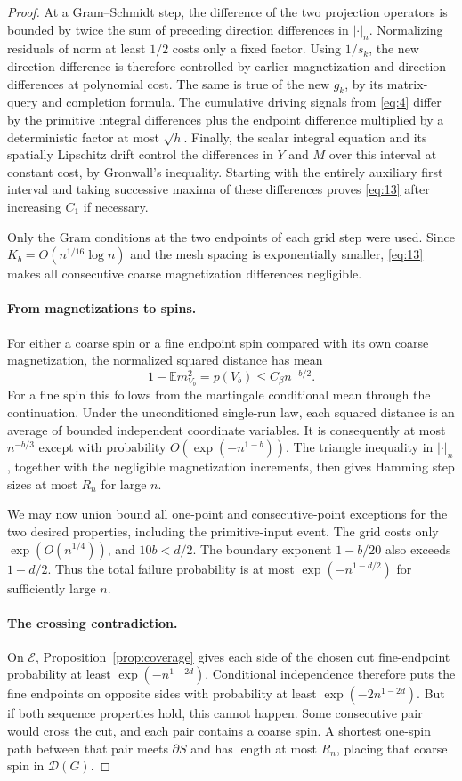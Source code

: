 \begin{proof}
At a Gram--Schmidt step, the difference of the two projection
operators is bounded by twice the sum of preceding direction
differences in $|\cdot|_n$. Normalizing residuals of norm at least
$1/2$ costs only a fixed factor. Using $1/s_k$, the new direction
difference is therefore controlled by earlier magnetization and
direction differences at polynomial cost. The same is true of the
new $g_k$, by its matrix-query and completion formula. The cumulative
driving signals from \eqref{eq:4} differ by the primitive integral
differences plus the endpoint difference multiplied by a deterministic
factor at most $\sqrt h$. Finally, the scalar integral equation
and its spatially Lipschitz drift control the differences in $Y$ and
$M$ over this interval at constant cost, by Gronwall's inequality.
Starting with the entirely auxiliary first interval and taking
successive maxima of these differences proves \eqref{eq:13} after
increasing $C_1$ if necessary.

Only the Gram conditions at the two endpoints of each grid step
were used. Since $K_b=O(n^{1/16}\log n)$ and the mesh spacing is
exponentially smaller, \eqref{eq:13} makes all consecutive coarse
magnetization differences negligible.

\paragraph{From magnetizations to spins.}
For either a coarse spin or a fine endpoint spin compared with its
own coarse magnetization, the normalized squared distance has mean
\[
 1-\mathbb E m_{V_b}^2=p(V_b)\le C_\beta n^{-b/2}.
\]
For a fine spin this follows from the martingale conditional mean
through the continuation. Under the unconditioned single-run law,
each squared distance is an average of bounded independent coordinate
variables. It is consequently at most $n^{-b/3}$ except with
probability $O(\exp(-n^{1-b}))$. The triangle inequality in
$|\cdot|_n$, together with the negligible magnetization increments,
then gives Hamming step sizes at most $R_n$ for large $n$.

We may now union bound all one-point and consecutive-point exceptions
for the two desired properties, including the primitive-input event.
The grid costs only $\exp(O(n^{1/4}))$, and $10b<d/2$.
The boundary exponent $1-b/20$ also exceeds $1-d/2$.
Thus the total failure probability is at most
$\exp(-n^{1-d/2})$ for sufficiently large $n$.

\paragraph{The crossing contradiction.}
On $\mathcal E$, Proposition~\ref{prop:coverage} gives each side of the
chosen cut fine-endpoint probability at least
$\exp(-n^{1-2d})$. Conditional independence therefore puts the
fine endpoints on opposite sides with probability at least
$\exp(-2n^{1-2d})$. But if both sequence properties hold, this
cannot happen. Some consecutive pair would cross the cut, and each
pair contains a coarse spin. A shortest one-spin path between that
pair meets $\partial S$ and has length at most $R_n$, placing
that coarse spin in $\mathcal D(G)$.


\end{proof}
